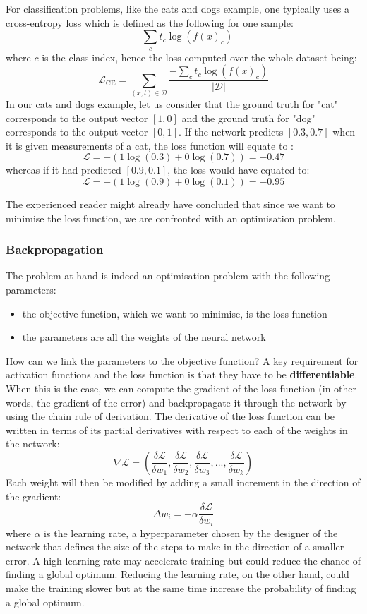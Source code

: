 For classification problems, like the cats and dogs example, one typically uses
a cross-entropy loss which is defined as the following for one sample:
$$-\sum\limits_c t_c\log(f(x)_c)$$
where $c$ is the class index, hence the loss computed over the whole dataset being:
$$\mathcal{L}_{\text{CE}} = \sum\limits_{(x, t) \in \mathcal{D}}
\frac{-\sum\limits_c t_c\log(f(x)_c)}{|\mathcal{D}|}$$
In our cats and dogs example, let us consider that the ground truth for
"cat" corresponds to the output vector $[1, 0]$ and the ground truth for "dog"
corresponds to the output vector $[0, 1]$. If the network predicts $[0.3, 0.7]$
when it is given measurements of a cat, the loss function will equate to :
$$ \mathcal{L} = -(1\log(0.3) + 0\log(0.7)) = -0.47$$
whereas if it had predicted $[0.9, 0.1]$, the loss would have equated to:
$$ \mathcal{L} = -(1\log(0.9) + 0\log(0.1)) = -0.95$$

The experienced reader might already have concluded that since we want to
minimise the loss function, we are confronted with an optimisation problem.

\subsubsection{Backpropagation}
The problem at hand is indeed an optimisation problem with the following
parameters:
\begin{itemize}
	\item the objective function, which we want to minimise, is the loss 
		function
	\item the parameters are all the weights of the neural network
\end{itemize}
How can we link the parameters to the objective function? A key requirement
for activation functions and the loss function is that they have to be
\textbf{differentiable}. When this is the case, we can compute the gradient
of the loss function (in other words, the gradient of the error) and 
backpropagate it through the network by using the
chain rule of derivation. The derivative of the loss function can be written
in terms of its partial derivatives with respect to each of the weights
in the network:
$$\nabla\mathcal{L} = \left(
  \frac{\delta\mathcal{L}}{\delta w_1}, 
  \frac{\delta\mathcal{L}}{\delta w_2}, 
  \frac{\delta\mathcal{L}}{\delta w_3}, ...,
  \frac{\delta\mathcal{L}}{\delta w_k}\right) 
$$
Each weight will then be modified by adding a small increment in the direction 
of the gradient:
$$ \Delta w_i = - \alpha \frac{\delta\mathcal{L}}{\delta w_i}$$
where $\alpha$ is the learning rate, a hyperparameter chosen by the designer
of the network that defines the size of the steps to make in the direction
of a smaller error. A high learning rate may accelerate training but could
reduce the chance of finding a global optimum. Reducing the learning rate,
on the other hand, could make the training slower but at the same time 
increase the probability of finding a global optimum.\\

